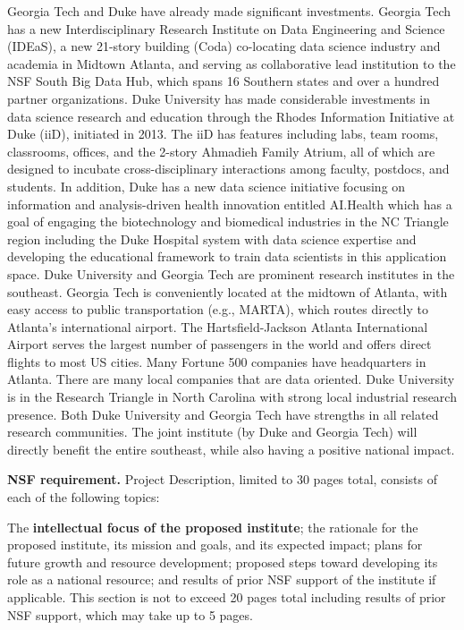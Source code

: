 \documentclass[12pt]{article}
\begin{document}
Georgia Tech and Duke have already made significant investments. Georgia Tech has a new Interdisciplinary Research
Institute on Data Engineering and Science (IDEaS), a new 21-story building (Coda) co-locating data science industry and academia in Midtown Atlanta, and serving as collaborative lead institution to the NSF South Big Data Hub, which spans 16 Southern states and over a hundred partner organizations. Duke University has made considerable investments in data science research and education through the Rhodes Information Initiative at Duke (iiD), initiated in 2013.
The iiD has features including labs, team rooms, classrooms, offices, and the 2-story Ahmadieh Family Atrium, all of which are designed to incubate cross-disciplinary interactions among faculty, postdocs, and students. In addition, Duke has a new data science initiative focusing on information and analysis-driven health innovation entitled AI.Health which has a goal of engaging the biotechnology and biomedical industries in the NC Triangle region
including the Duke Hospital system with data science expertise and developing the educational framework to train data scientists in this application space. Duke University and Georgia Tech are prominent research institutes in the southeast. Georgia Tech is conveniently located at the midtown of Atlanta, with easy access to public transportation (e.g., MARTA), which routes directly to Atlanta's international airport. The Hartsfield-Jackson Atlanta International
Airport serves the largest number of passengers in the world and offers direct flights to most US cities. Many Fortune 500 companies have headquarters in Atlanta. There are many local companies that are data oriented. Duke University is in the Research Triangle in North Carolina with strong local industrial research presence. Both Duke University and Georgia Tech have strengths in all related research communities. The joint institute (by Duke and Georgia Tech) will directly benefit the entire southeast, while also having a positive national impact.

\clearpage

{\bf NSF requirement.}
Project Description, limited to 30 pages total, consists of each of the following topics:

The {\bf intellectual focus of the proposed institute}; the rationale for the proposed institute, its mission and goals, and its expected impact; plans for future growth and resource development; proposed steps toward developing its role as a national resource; and results of prior NSF support of the institute if applicable. This section is not to exceed 20 pages total including results of prior NSF support, which may take up to 5 pages.
\end{document}
